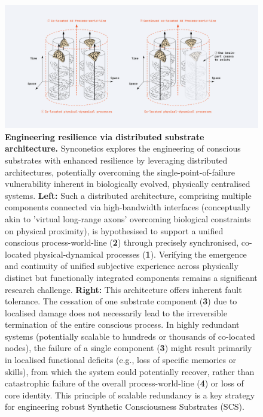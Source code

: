\documentclass[10pt]{article}
\begin{document}
\begin{sloppypar}
  \begin{figure}[ht!]
    \centering
    \includegraphics[width=\textwidth]{figures/co-located_4D-process-world-line.png}
    \caption[Engineering resilience via distributed substrate architecture]{\textbf{Engineering resilience via distributed substrate architecture.} Synconetics explores the engineering of conscious substrates with enhanced resilience by leveraging distributed architectures, potentially overcoming the single-point-of-failure vulnerability inherent in biologically evolved, physically centralised systems. \textbf{Left:} Such a distributed architecture, comprising multiple components connected via high-bandwidth interfaces (conceptually akin to 'virtual long-range axons' overcoming biological constraints on physical proximity), is hypothesised to support a unified conscious process-world-line (\textbf{2}) through precisely synchronised, co-located physical-dynamical processes (\textbf{1}). Verifying the emergence and continuity of unified subjective experience across physically distinct but functionally integrated components remains a significant research challenge. \textbf{Right:} This architecture offers inherent fault tolerance. The cessation of one substrate component (\textbf{3}) due to localised damage does not necessarily lead to the irreversible termination of the entire conscious process. In highly redundant systems (potentially scalable to hundreds or thousands of co-located nodes), the failure of a single component (\textbf{3}) might result primarily in localised functional deficits (e.g., loss of specific memories or skills), from which the system could potentially recover, rather than catastrophic failure of the overall process-world-line (\textbf{4}) or loss of core identity. This principle of scalable redundancy is a key strategy for engineering robust Synthetic Consciousness Substrates (SCS).}
    \label{fig:resilience-redundancy}
  \end{figure}


\end{sloppypar}
\end{document}
